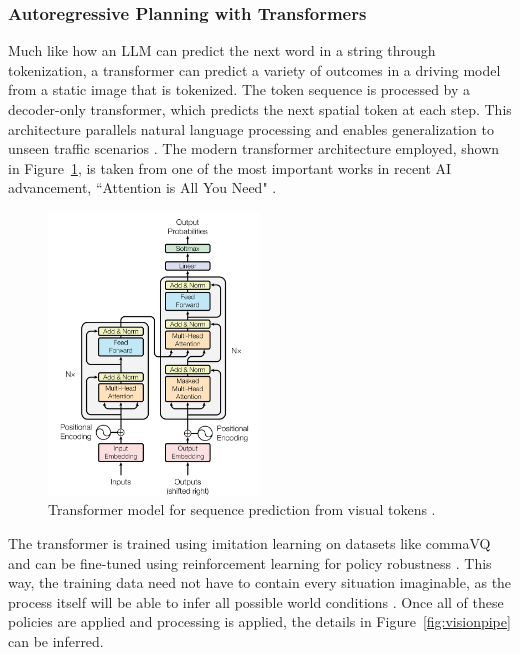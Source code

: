 \documentclass[12pt]{article}
\begin{document}
\subsubsection{Autoregressive Planning with Transformers}
Much like how an LLM can predict the next word in a string through tokenization,
a transformer can predict a variety of outcomes in a driving model from a static
image that is tokenized. The token sequence is processed by a decoder-only
transformer, which predicts the next spatial token at each step. This
architecture parallels natural language processing and enables generalization to
unseen traffic scenarios \cite{drivingsim}. The modern transformer architecture
employed, shown in Figure~\ref{fig:transformer}, is taken from one of the most
important works in recent AI advancement, ``Attention is All You Need"
\cite{vaswani2023attentionneed}.
\begin{figure}[H]
    \centering
    \includegraphics[width=0.5\textwidth]{architecture2}
    \caption{Transformer model for sequence prediction from visual tokens \autocite{vaswani2023attentionneed}.}
    \label{fig:transformer}
\end{figure}

The transformer is trained using imitation learning on datasets like commaVQ and
can be fine-tuned using reinforcement learning for policy robustness
\autocite{drivingsim}. This way, the training data need not have to contain
every situation imaginable, as the process itself will be able to infer all
possible world conditions \cite{goff2025learningdriveworldmodel}. Once all of
these policies are applied and processing is applied, the details in
Figure~\ref{fig:visionpipe} can be inferred.
\end{document}
